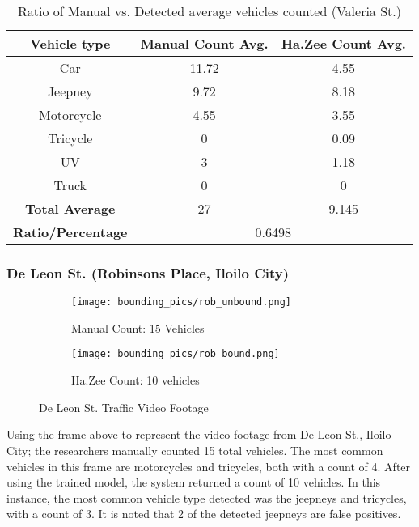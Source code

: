 \begin{table}[ht]   %
	\centering
	\caption{Ratio of Manual vs. Detected average vehicles counted  (Valeria St.)} \vspace{0.25em}
	\begin{tabular}{c|c|c} \hline
		\centering \textbf {Vehicle type} & \textbf{Manual Count Avg.} & \textbf{Ha.Zee Count Avg.} \\ \hline
		Car & 11.72 & 4.55   \\ 
		Jeepney & 9.72 & 8.18  	\\ 
		Motorcycle& 4.55  & 3.55   \\ 
		Tricycle   & 0  & 0.09  \\ 
		UV & 3 & 1.18  \\ 
		Truck & 0 & 0 \\ \hline
		
		\textbf{Total Average} &27 & 9.145\\ \hline
		\textbf{Ratio/Percentage} & \multicolumn{2}{c}{0.6498}  \\ \hline
		
	\end{tabular}
	\label{tab:valeria_st}
\end{table}

\newpage
\subsubsection{De Leon St.  (Robinsons Place, Iloilo City)
}


\begin{figure}[!htbp]
	\begin{subfigure}{.5\textwidth}
		\centering
		\texttt{[image: bounding\_pics/rob\_unbound.png]}
		\caption{Manual Count: 15 Vehicles}
		
	\end{subfigure}%
	\begin{subfigure}{.5\textwidth}
		\centering
		\texttt{[image: bounding\_pics/rob\_bound.png]}
		\caption{Ha.Zee Count: 10 vehicles}
	\end{subfigure}
	\caption{De Leon St. Traffic Video Footage}
\end{figure}
\FloatBarrier

Using the frame above to represent the video footage from De Leon St., Iloilo City; the researchers manually counted 15 total vehicles. The most common vehicles in this frame are motorcycles and tricycles, both with a count of 4. After using the trained model, the system returned a count of 10 vehicles. In this instance, the most common vehicle type detected was the jeepneys and tricycles, with a count of 3. It is noted that 2 of the detected jeepneys are false positives.

